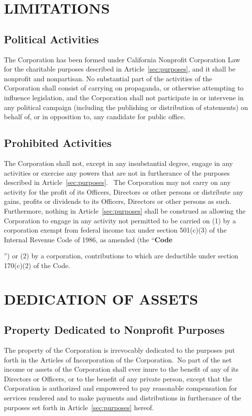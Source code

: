 \documentclass[letterpaper,titlepage]{article}
\newcommand{\defn}[1]{\refstepcounter{defn}\textbf{#1}\addcontentsline{defn}{defn}{\protect\numberline{\thedefn}#1}}
\begin{document}
\section{LIMITATIONS}
\label{sec:limitations}
\subsection{Political Activities}
\label{sec:politicalActivities}
The Corporation has been formed under California Nonprofit Corporation Law for
the charitable purposes described in Article~\ref{sec:purposes}, and it shall be nonprofit and nonpartisan. No substantial part of the activities of the Corporation shall consist of carrying on propaganda, or otherwise attempting to influence legislation, and the Corporation shall not participate in or intervene in any political campaign (including the publishing or distribution of statements) on behalf of, or in opposition to, any candidate for public office.
\subsection{Prohibited Activities}
\label{sec:prohibitedActivities}
The Corporation shall not, except in any insubstantial degree, engage in any
activities or exercise any powers that are not in furtherance of the purposes
described in Article~\ref{sec:purposes}.  The Corporation may not carry on any
activity for the profit of its Officers, Directors or other persons or
distribute any gains, profits or dividends to its Officers, Directors or other
persons as such.  Furthermore, nothing in Article~\ref{sec:purposes} shall be
construed as allowing the Corporation to engage in any activity not permitted
to be carried on (1) by a corporation exempt from federal income tax under
section 501(c)(3) of the Internal Revenue Code of 1986, as amended (the
``\defn{Code}'') or (2) by a corporation, contributions to which are deductible under section 170(c)(2) of the Code.
\section{DEDICATION OF ASSETS}
\label{sec:dedicationAssets}
\subsection{Property Dedicated to Nonprofit Purposes}
\label{sec:propertyDedicated}
The property of the Corporation is irrevocably dedicated to the purposes put
forth in the Articles of Incorporation of the Corporation. No part of the net
income or assets of the Corporation shall ever inure to the benefit of any of
its Directors or Officers, or to the benefit of any private person, except that
the Corporation is authorized and empowered to pay reasonable compensation for
services rendered and to make payments and distributions in furtherance of the
purposes set forth in Article~\ref{sec:purposes} hereof.
\end{document}
